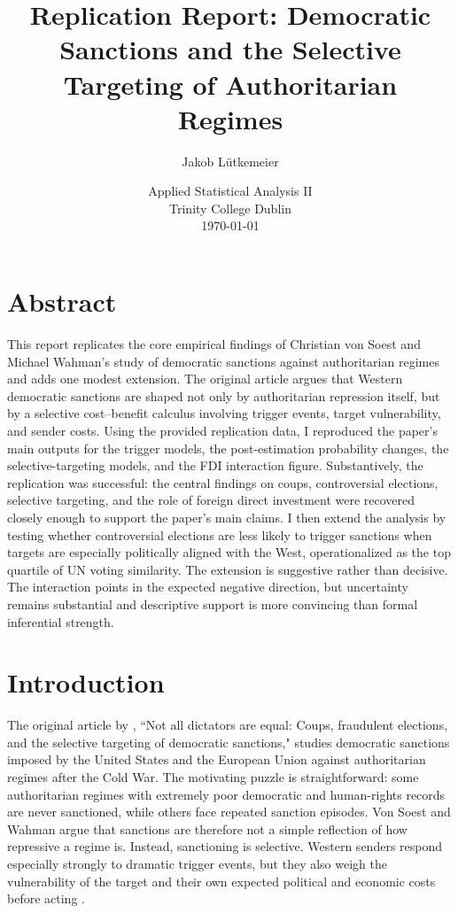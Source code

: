 \documentclass[12pt,letterpaper]{article}
\title{Replication Report: Democratic Sanctions and the Selective Targeting of Authoritarian Regimes}
\date{Applied Statistical Analysis II \\ Trinity College Dublin \\ \today}
\author{Jakob L\"utkemeier}
\begin{document}
	\maketitle
	
	
	\section*{Abstract}
	
	This report replicates the core empirical findings of Christian von Soest and Michael Wahman's study of democratic sanctions against authoritarian regimes and adds one modest extension. The original article argues that Western democratic sanctions are shaped not only by authoritarian repression itself, but by a selective cost--benefit calculus involving trigger events, target vulnerability, and sender costs. Using the provided replication data, I reproduced the paper's main outputs for the trigger models, the post-estimation probability changes, the selective-targeting models, and the FDI interaction figure. Substantively, the replication was successful: the central findings on coups, controversial elections, selective targeting, and the role of foreign direct investment were recovered closely enough to support the paper's main claims. I then extend the analysis by testing whether controversial elections are less likely to trigger sanctions when targets are especially politically aligned with the West, operationalized as the top quartile of UN voting similarity. The extension is suggestive rather than decisive. The interaction points in the expected negative direction, but uncertainty remains substantial and descriptive support is more convincing than formal inferential strength.
	
	\section{Introduction}
		
	The original article by  \citet{vonsoestNotAllDictators2015}, ``Not all dictators are equal: Coups, fraudulent elections, and the selective targeting of democratic sanctions," studies democratic sanctions imposed by the United States and the European Union against authoritarian regimes after the Cold War. The motivating puzzle is straightforward: some authoritarian regimes with extremely poor democratic and human-rights records are never sanctioned, while others face repeated sanction episodes. Von Soest and Wahman argue that sanctions are therefore not a simple reflection of how repressive a regime is. Instead, sanctioning is selective. Western senders respond especially strongly to dramatic trigger events, but they also weigh the vulnerability of the target and their own expected political and economic costs before acting \citep{vonsoestNotAllDictators2015}.
	
\end{document}
